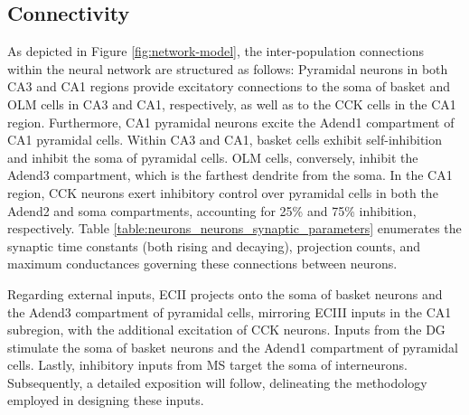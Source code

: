 \documentclass[../main.tex]{subfiles}
\begin{document}
\subsection{Connectivity}
As depicted in Figure \ref{fig:network-model}, the inter-population connections within the neural network are structured as follows:
Pyramidal neurons in both CA3 and CA1 regions provide excitatory connections to the soma of basket and OLM cells in CA3 and CA1, respectively, as well as to the CCK cells in the CA1 region. Furthermore, CA1 pyramidal neurons excite the Adend1 compartment of CA1 pyramidal cells.
Within CA3 and CA1, basket cells exhibit self-inhibition and inhibit the soma of pyramidal cells.
OLM cells, conversely, inhibit the Adend3 compartment, which is the farthest dendrite from the soma.
In the CA1 region, CCK neurons exert inhibitory control over pyramidal cells in both the Adend2 and soma compartments, accounting for 25\% and 75\% inhibition, respectively.
Table \ref{table:neurons_neurons_synaptic_parameters} enumerates the synaptic time constants (both rising and decaying), projection counts, and maximum conductances governing these connections between neurons.

Regarding external inputs, ECII projects onto the soma of basket neurons and the Adend3 compartment of pyramidal cells, mirroring ECIII inputs in the CA1 subregion, with the additional excitation of CCK neurons. Inputs from the DG stimulate the soma of basket neurons and the Adend1 compartment of pyramidal cells. Lastly, inhibitory inputs from MS target the soma of interneurons. Subsequently, a detailed exposition will follow, delineating the methodology employed in designing these inputs.
\end{document}
